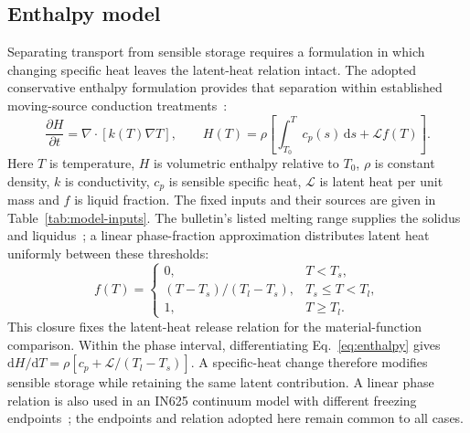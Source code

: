 \documentclass[preprint,12pt]{elsarticle}
\begin{document}
\subsection{Enthalpy model}
Separating transport from sensible storage requires a formulation in which changing specific heat leaves the latent-heat relation intact. The adopted conservative enthalpy formulation provides that separation within established moving-source conduction treatments~\cite{vanelsen2007}:
\begin{equation}
 \frac{\partial H}{\partial t}=\nabla\cdot[k(T)\nabla T],\qquad
 H(T)=\rho\left[\int_{T_0}^{T}c_p(s)\,\mathrm ds+\mathcal L f(T)\right].
 \label{eq:enthalpy}
\end{equation}
Here $T$ is temperature, $H$ is volumetric enthalpy relative to $T_0$, $\rho$ is constant density, $k$ is conductivity, $c_p$ is sensible specific heat, $\mathcal L$ is latent heat per unit mass and $f$ is liquid fraction. The fixed inputs and their sources are given in Table~\ref{tab:model-inputs}. The bulletin's listed melting range supplies the solidus and liquidus~\cite{specialmetals625}; a linear phase-fraction approximation distributes latent heat uniformly between these thresholds:
\begin{equation}
 f(T)=\begin{cases}
 0,&T<T_s,\\
 (T-T_s)/(T_l-T_s),&T_s\leq T<T_l,\\
 1,&T\geq T_l.
 \end{cases}
 \label{eq:phase-fraction}
\end{equation}
This closure fixes the latent-heat release relation for the material-function comparison. Within the phase interval, differentiating Eq.~\eqref{eq:enthalpy} gives $\mathrm dH/\mathrm dT=\rho[c_p+\mathcal L/(T_l-T_s)]$. A specific-heat change therefore modifies sensible storage while retaining the same latent contribution. A linear phase relation is also used in an IN625 continuum model with different freezing endpoints~\cite{dynamic2024}; the endpoints and relation adopted here remain common to all cases.
\end{document}
